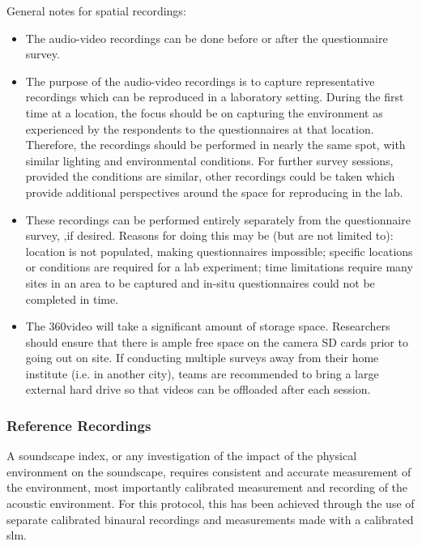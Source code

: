    General notes for spatial recordings:

   \begin{itemize}
     \item The audio-video recordings can be done before or after the questionnaire survey.
     \item The purpose of the audio-video recordings is to capture representative recordings which can be reproduced in a laboratory setting. During the first time at a location, the focus should be on capturing the environment as experienced by the respondents to the questionnaires at that location. Therefore, the recordings should be performed in nearly the same spot, with similar lighting and environmental conditions. For further survey sessions, provided the conditions are similar, other recordings could be taken which provide additional perspectives around the space for reproducing in the lab.
     \item These recordings can be performed entirely separately from the questionnaire survey, ,if desired. Reasons for doing this may be (but are not limited to): location is not populated, making questionnaires impossible; specific locations or conditions are required for a lab experiment; time limitations require many sites in an area to be captured and in-situ questionnaires could not be completed in time.
     \item The 360\degree video will take a significant amount of storage space. Researchers should ensure that there is ample free space on the camera SD cards prior to going out on site. If conducting multiple surveys away from their home institute (i.e. in another city), teams are recommended to bring a large external hard drive so that videos can be offloaded after each session.
   \end{itemize}

   \subsubsection{Reference Recordings}

   A soundscape index, or any investigation of the impact of the physical environment on the soundscape, requires consistent and accurate measurement of the environment, most importantly calibrated measurement and recording of the acoustic environment. For this protocol, this has been achieved through the use of separate calibrated binaural recordings and measurements made with a calibrated \gls{slm}.



